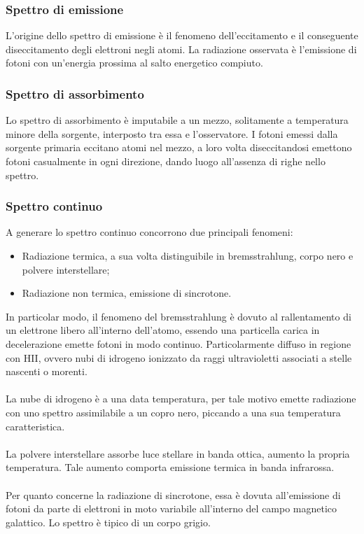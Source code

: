 \subsubsection*{Spettro di emissione}
L'origine dello spettro di emissione è il fenomeno dell'eccitamento e il conseguente diseccitamento degli elettroni negli atomi. La radiazione osservata è l'emissione di fotoni con un'energia prossima al salto energetico compiuto.


\subsubsection*{Spettro di assorbimento}
Lo spettro di assorbimento è imputabile a un mezzo, solitamente a temperatura minore della sorgente, interposto tra essa e l'osservatore. I fotoni emessi dalla sorgente primaria eccitano atomi nel mezzo, a loro volta diseccitandosi emettono fotoni casualmente in ogni direzione, dando luogo all'assenza di righe nello spettro.

\subsubsection*{Spettro continuo}
A generare lo spettro continuo concorrono due principali fenomeni: 
\begin{itemize}
\item Radiazione termica, a sua volta distinguibile in bremsstrahlung, corpo nero e polvere interstellare;
\item Radiazione non termica, emissione di sincrotone. 
\end{itemize}

In particolar modo, il fenomeno del bremsstrahlung è dovuto al rallentamento di un elettrone libero all'interno dell'atomo, essendo una particella carica in decelerazione emette fotoni in modo continuo. Particolarmente diffuso in regione con HII, ovvero nubi di idrogeno ionizzato da raggi ultravioletti associati a stelle nascenti o morenti.
\\\\
La nube di idrogeno è a una data temperatura, per tale motivo emette radiazione con uno spettro assimilabile a un copro nero, piccando a una sua temperatura caratteristica. 
\\\\
La polvere interstellare assorbe luce stellare in banda ottica, aumento la propria temperatura. Tale aumento comporta emissione termica in banda infrarossa.
\\\\
Per quanto concerne la radiazione di sincrotone, essa è dovuta all'emissione di fotoni da parte di elettroni in moto variabile all'interno del campo magnetico galattico. Lo spettro è tipico di un corpo grigio.


